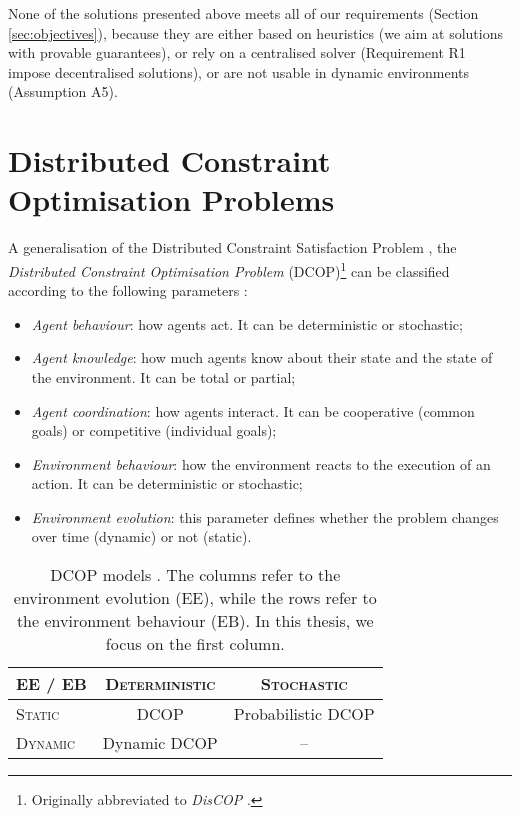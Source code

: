 None of the solutions presented above meets all of our requirements (Section
\ref{sec:objectives}), because they are either based on heuristics
\cite{allen2010,baker2016,wu2016,bazinin2018} (we aim at solutions with provable
guarantees), or rely on a centralised solver \cite{amato2015,ramchurn2015a,ramchurn2016}
(Requirement R1 impose decentralised solutions), or are not usable in dynamic environments
\cite{lee2021} (Assumption A5).

\section{Distributed Constraint Optimisation Problems}\label{sec:dcop0}

A generalisation of the Distributed Constraint Satisfaction Problem
\cite{yokoo1998}, the \emph{Distributed Constraint Optimisation Problem}
(DCOP)\footnote{Originally abbreviated to \emph{DisCOP} \cite{meisels2007}.}
\cite{farinelli2013dcop} can be classified according to the following parameters
\cite{fioretto2018survey}:
\begin{itemize}
    \item \emph{Agent behaviour}: how agents act. It can be deterministic or stochastic;
    \item \emph{Agent knowledge}: how much agents know about their state and the state of
        the environment. It can be total or partial;
    \item \emph{Agent coordination}: how agents interact. It can be cooperative (common
        goals) or competitive (individual goals);
    \item \emph{Environment behaviour}: how the environment reacts to the execution of an
        action. It can be deterministic or stochastic;
    \item \emph{Environment evolution}: this parameter defines whether the problem changes
        over time (dynamic) or not (static).
\end{itemize}

\begin{table}[t]
    \centering
    \begin{tabular}{lcc}
        \toprule
        EE / EB &
        \textsc{Deterministic} & \textsc{Stochastic}\\
        \midrule
        \textsc{Static} & DCOP & Probabilistic DCOP\\
        \midrule
        \textsc{Dynamic} & Dynamic DCOP & --\\
        \bottomrule
    \end{tabular}
    \caption[DCOP model taxonomy]{DCOP models \cite{fioretto2018survey}. The columns refer
    to the environment evolution (EE), while the rows refer to the environment behaviour
    (EB). In this thesis, we focus on the first column.}
    \label{t:dcop}
\end{table}

